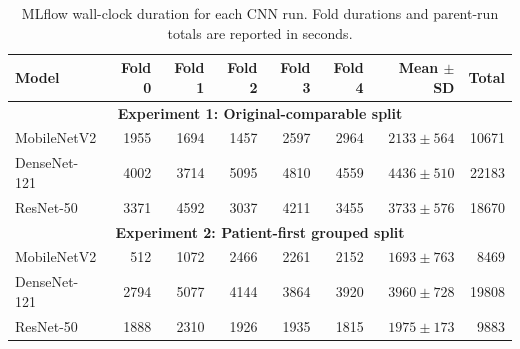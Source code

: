\begin{table}[t]
\caption{MLflow wall-clock duration for each CNN run. Fold durations and parent-run totals are reported in seconds.}
\label{tab:cnn-execution-time}
\centering
\scriptsize
\begin{tabular}{@{}lrrrrrrr@{}}
\toprule
Model & Fold 0 & Fold 1 & Fold 2 & Fold 3 & Fold 4 & Mean $\pm$ SD & Total \\
\midrule
\multicolumn{8}{c}{\textbf{Experiment 1: Original-comparable split}} \\
\midrule
MobileNetV2 & 1955 & 1694 & 1457 & 2597 & 2964 & $2133 \pm 564$ & 10671 \\
DenseNet-121 & 4002 & 3714 & 5095 & 4810 & 4559 & $4436 \pm 510$ & 22183 \\
ResNet-50 & 3371 & 4592 & 3037 & 4211 & 3455 & $3733 \pm 576$ & 18670 \\
\midrule
\multicolumn{8}{c}{\textbf{Experiment 2: Patient-first grouped split}} \\
\midrule
MobileNetV2 & 512 & 1072 & 2466 & 2261 & 2152 & $1693 \pm 763$ & 8469 \\
DenseNet-121 & 2794 & 5077 & 4144 & 3864 & 3920 & $3960 \pm 728$ & 19808 \\
ResNet-50 & 1888 & 2310 & 1926 & 1935 & 1815 & $1975 \pm 173$ & 9883 \\
\bottomrule
\end{tabular}
\end{table}
